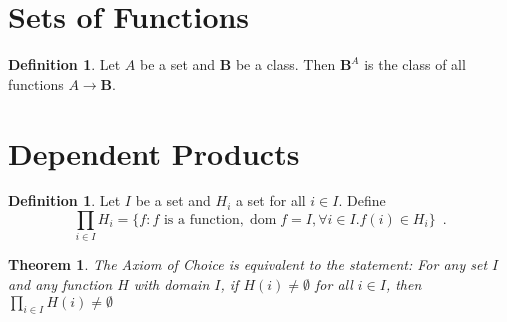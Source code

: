 \documentclass{article}
\newtheorem{theorem}[axiom]{Theorem}
\theoremstyle{definition}
\newtheorem{definition}[axiom]{Definition}
\newcommand{\dom}{\ensuremath{\operatorname{dom}}}
\begin{document}
    \section{Sets of Functions}

    \begin{definition}
        Let $A$ be a set and $\mathbf{B}$ be a class. Then $\mathbf{B}^A$ is the class of all functions
        $A \rightarrow \mathbf{B}$.
    \end{definition}

    \section{Dependent Products}

    \begin{definition}
        Let $I$ be a set and $H_i$ a set for all $i \in I$. Define
        \[ \prod_{i \in I} H_i = \{ f : \text{$f$ is a function}, \dom f = I, \forall i \in I. f(i) \in H_i \} \enspace . \]
    \end{definition}

    \begin{theorem}
        The Axiom of Choice is equivalent to the statement: For any set $I$ and any function $H$ with domain
        $I$, if $H(i) \neq \emptyset$ for all $i \in I$, then $\prod_{i \in I} H(i) \neq \emptyset$
    \end{theorem}
\end{document}
